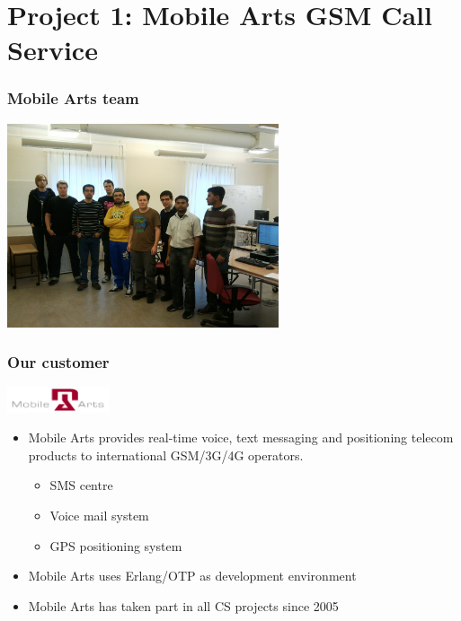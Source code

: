 \documentclass{beamer}
\begin{document}
\section{Project 1: Mobile Arts GSM Call Service}

\begin{frame}
	\frametitle{Mobile Arts team}
	\begin{center}
		\includegraphics[width=8cm]{images/mobile_arts/team.jpg}
	\end{center}
\end{frame}

\begin{frame}
	\frametitle{Our customer}

 	\begin{center}
		\includegraphics[width=3cm]{images/mobile_arts/mobilearts_logo.pdf}
	\end{center}	

	\begin{itemize}

	\item
	Mobile Arts provides real-time voice, text messaging and positioning telecom
	products to international GSM/3G/4G operators.

		\begin{itemize}
		\item
		SMS centre
		\item
		Voice mail system
		\item
		GPS positioning system
		\end{itemize}

	\item
	Mobile Arts uses Erlang/OTP as development environment

	\item
	Mobile Arts has taken part in all CS projects since 2005

	\end{itemize}

\end{frame}
\end{document}
